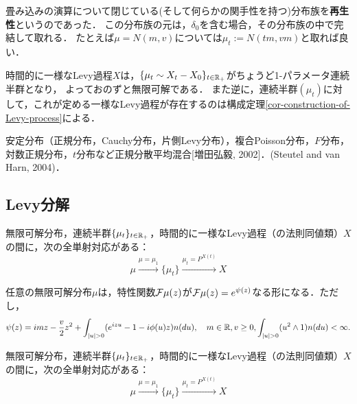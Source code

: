 \documentclass[uplatex,dvipdfmx]{jsreport}
\begin{document}
\begin{example}
    畳み込みの演算について閉じている(そして何らかの関手性を持つ)分布族を\textbf{再生性}というのであった．
    この分布族の元は，$\delta_0$を含む場合，その分布族の中で完結して取れる．
    たとえば$\mu=N(m,v)$については$\mu_t:=N(tm,vm)$と取れば良い．
\end{example}

\begin{example}[時間的に一様なLevy過程]
    時間的に一様なLevy過程$X$は，$\{\mu_t\sim X_t-X_0\}_{t\in\mathbb{R}_+}$がちょうど1-パラメータ連続半群となり，
    よっておのずと無限可解である．
    また逆に，連続半群$(\mu_t)$に対して，これが定める一様なLevy過程が存在するのは構成定理\ref{cor-construction-of-Levy-process}による．
\end{example}

\begin{example}
    安定分布（正規分布，Cauchy分布，片側Levy分布），複合Poisson分布，$F$分布，対数正規分布，$t$分布など正規分散平均混合[増田弘毅, 2002]．(Steutel and van Harn, 2004)．
\end{example}

\subsection{Levy分解}

\begin{tcolorbox}[colframe=ForestGreen, colback=ForestGreen!10!white,breakable,colbacktitle=ForestGreen!40!white,coltitle=black,fonttitle=\bfseries\sffamily,
title=]
    無限可解分布，連続半群$\{\mu_t\}_{t\in\mathbb{R}_+}$，時間的に一様なLevy過程（の法則同値類）$X$の間に，次の全単射対応がある：
    \[\mu\xrightarrow{\mu=\mu_1}\{\mu_t\}\xrightarrow{\mu_t=P^{X(t)}}X\]
\end{tcolorbox}

\begin{theorem}[無限可解分布のLevy分解定理]
    任意の無限可解分布$\mu$は，特性関数$\mathcal{F}\mu(z)$が$\mathcal{F}\mu(z)=e^{\psi(z)}$なる形になる．ただし，
    \[\psi(z)=imz-\frac{v}{2}z^2+\int_{\lvert u\rvert>0}(e^{izu}-1-i\phi(u)z)n(du),\quad m\in\mathbb{R},v\ge0,\int_{\lvert u\rvert>0}(u^2\land 1)n(du)<\infty.\]
\end{theorem}

\begin{corollary}
    無限可解分布，連続半群$\{\mu_t\}_{t\in\mathbb{R}_+}$，時間的に一様なLevy過程（の法則同値類）$X$の間に，次の全単射対応がある：
    \[\mu\xrightarrow{\mu=\mu_1}\{\mu_t\}\xrightarrow{\mu_t=P^{X(t)}}X\]
\end{corollary}
\end{document}
